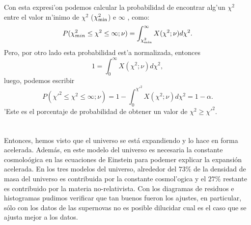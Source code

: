 Con esta expresi'on podemos calcular la probabilidad de encontrar alg'un $\chi^2$ entre el valor m'inimo de $\chi^2$ ($\chi^2_{\rm{min}}$) e $\infty$ , como:
\begin{equation}
P(\chi^2_{min}\leq\chi^2\leq\infty;\nu)=\int^{\infty}_{\chi^2_{\rm{min}}}X(\chi^2;\nu)d\chi^2.
\end{equation}
Pero, por otro lado esta probabilidad est'a normalizada, entonces
\begin{equation}
 1=\int^{\infty}_0 X(\chi^2;\nu)d\chi^2,
\end{equation}
luego, podemos escribir 
\begin{equation}
P(\chi'^2\leq\chi^2\leq\infty;\nu)=1- \int^{\chi'^2}_0 X(\chi^2;\nu)d\chi^2 = 1 -\alpha.
\end{equation}
'Este es el porcentaje de probabilidad de obtener un valor de $\chi^2 \geq \chi'^2$. \\ \\ \\

Entonces, hemos visto que el universo se est\'a expandiendo y lo hace en forma acelerada. Adem\'as, en este modelo del universo es 
necesaria la constante cosmolo\'ogica en las ecuaciones de Einstein para podemer explicar la expansi\'on acelerada. En los tres modelos
del universo, alrededor del $73\%$ de la densidad de masa del universo es contribuida por la constante cosmol'ogica y el $27\%$
restante es contribuido por la materia no-relativista. Con los diagramas de residuos e histogramas pudimos verificar que tan buenos fueron
los ajustes, en particular, s\'olo con los datos de las supernovas no es posible dilucidar cual es el caso que se ajusta mejor a los datos.